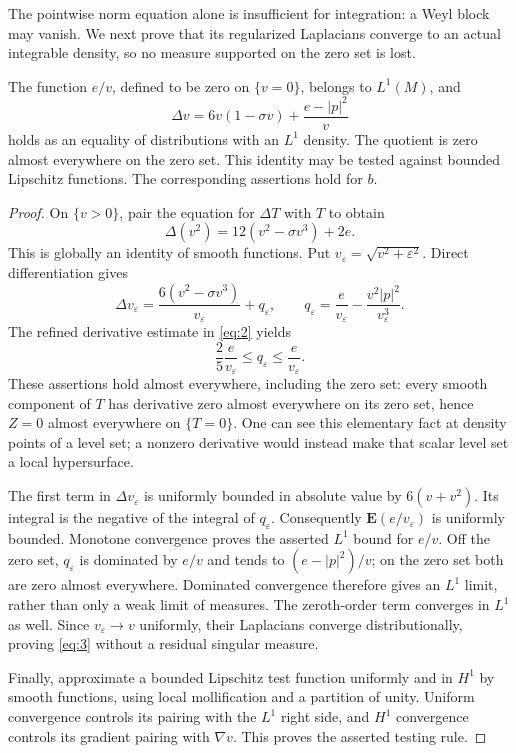 The pointwise norm equation alone is insufficient for integration:
a Weyl block may vanish. We next prove that its regularized Laplacians
converge to an actual integrable density, so no measure supported on the
zero set is lost.

\begin{proposition}
\label{prop:weak-norm-equation}
The function $e/v$, defined to be zero on $\{v=0\}$, belongs to
$L^1(M)$, and
\begin{equation}
 \Delta v=6v(1-\sigma v)+\frac{e-|p|^2}{v}
 \tag{3}\label{eq:3}
\end{equation}
holds as an equality of distributions with an $L^1$ density.
The quotient is zero almost everywhere on the zero set.
This identity may be tested against bounded Lipschitz functions.
The corresponding assertions hold for $b$.
\end{proposition}

\begin{proof}
On $\{v>0\}$, pair the equation for $\Delta T$ with $T$ to obtain
\[
 \Delta(v^2)=12(v^2-\sigma v^3)+2e.
\]
This is globally an identity of smooth functions. Put
$v_\varepsilon=\sqrt{v^2+\varepsilon^2}$. Direct differentiation gives
\[
 \Delta v_\varepsilon
 =\frac{6(v^2-\sigma v^3)}{v_\varepsilon}
   +q_\varepsilon,\qquad
 q_\varepsilon=\frac e{v_\varepsilon}
             -\frac{v^2|p|^2}{v_\varepsilon^3}.
\]
The refined derivative estimate in \eqref{eq:2} yields
\[
 \frac25\frac e{v_\varepsilon}
 \le q_\varepsilon\le\frac e{v_\varepsilon}.
\]
These assertions hold almost everywhere, including the zero set:
every smooth component of $T$ has derivative zero almost everywhere
on its zero set, hence $Z=0$ almost everywhere on $\{T=0\}$.
One can see this elementary fact at density points of a level set;
a nonzero derivative would instead make that scalar level set a
local hypersurface.

The first term in $\Delta v_\varepsilon$ is uniformly bounded in
absolute value by $6(v+v^2)$. Its integral is the negative of the
integral of $q_\varepsilon$. Consequently
$\mathbf E(e/v_\varepsilon)$ is uniformly bounded.
Monotone convergence proves the asserted $L^1$ bound for $e/v$.
Off the zero set, $q_\varepsilon$ is dominated by $e/v$ and tends
to $(e-|p|^2)/v$; on the zero set both are zero almost everywhere.
Dominated convergence therefore gives an $L^1$ limit, rather than
only a weak limit of measures. The zeroth-order term converges in
$L^1$ as well. Since $v_\varepsilon\to v$ uniformly, their
Laplacians converge distributionally, proving \eqref{eq:3} without
a residual singular measure.

Finally, approximate a bounded Lipschitz test function uniformly and
in $H^1$ by smooth functions, using local mollification and a
partition of unity. Uniform convergence controls its pairing with
the $L^1$ right side, and $H^1$ convergence controls its gradient
pairing with $\nabla v$. This proves the asserted testing rule.
\end{proof}

